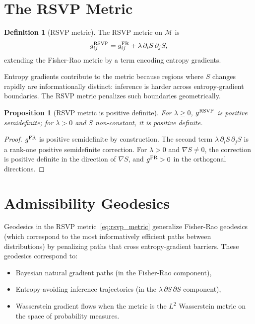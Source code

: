 \documentclass[11pt, openright, twoside]{book}
\theoremstyle{plain}
\newtheorem{proposition}[theorem]{Proposition}
\theoremstyle{definition}
\newtheorem{definition}[theorem]{Definition}
\theoremstyle{remark}
\newcommand{\Sfield}{S}
\begin{document}
\section{The RSVP Metric}

\begin{definition}[RSVP metric]
The RSVP metric on $\mathcal{M}$ is
\begin{equation}
  g^{\rm RSVP}_{ij} = g^{\rm FR}_{ij} + \lambda\,\partial_i\Sfield\,\partial_j\Sfield,
  \label{eq:rsvp_metric}
\end{equation}
extending the Fisher-Rao metric by a term encoding entropy gradients.
\end{definition}

Entropy gradients contribute to the metric because regions where $\Sfield$ changes rapidly
are informationally distinct: inference is harder across entropy-gradient boundaries. The
RSVP metric penalizes such boundaries geometrically.

\begin{proposition}[RSVP metric is positive definite]
For $\lambda\geq 0$, $g^{\rm RSVP}$ is positive semidefinite; for $\lambda>0$ and
$\Sfield$ non-constant, it is positive definite.
\end{proposition}

\begin{proof}
$g^{\rm FR}$ is positive semidefinite by construction. The second term
$\lambda\,\partial_i\Sfield\,\partial_j\Sfield$ is a rank-one positive semidefinite correction.
For $\lambda>0$ and $\nabla\Sfield\neq 0$, the correction is positive definite in the
direction of $\nabla\Sfield$, and $g^{\rm FR}>0$ in the orthogonal directions.
\end{proof}

\section{Admissibility Geodesics}

Geodesics in the RSVP metric~\eqref{eq:rsvp_metric} generalize Fisher-Rao geodesics
(which correspond to the most informatively efficient paths between distributions) by
penalizing paths that cross entropy-gradient barriers. These geodesics correspond to:
\begin{itemize}
\item Bayesian natural gradient paths (in the Fisher-Rao component),
\item Entropy-avoiding inference trajectories (in the $\lambda\,\partial\Sfield\,\partial\Sfield$ component),
\item Wasserstein gradient flows when the metric is the $L^2$ Wasserstein metric on the space of probability measures.
\end{itemize}
\end{document}
